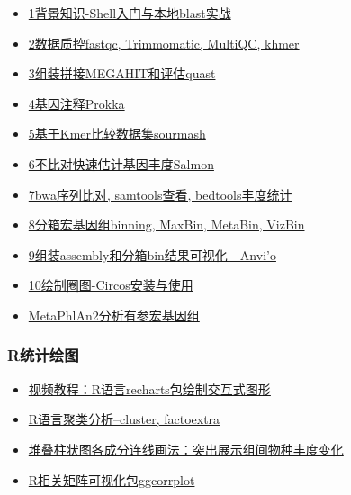 \documentclass[]{article}
\providecommand{\tightlist}{%
  \setlength{\itemsep}{0pt}\setlength{\parskip}{0pt}}
\numberwithin{figure}{section}
\numberwithin{table}{section}
\begin{document}
\begin{itemize}
\tightlist
\item
  \href{http://mp.weixin.qq.com/s/jASOBPzpwYCL-fWNUJJp8g}{1背景知识-Shell入门与本地blast实战}
\item
  \href{http://mp.weixin.qq.com/s/3O01eNMe79J_kUTaJjP6ag}{2数据质控fastqc, Trimmomatic, MultiQC, khmer}
\item
  \href{http://mp.weixin.qq.com/s/NMKX0iDuR_qOzmLXxC8MEQ}{3组装拼接MEGAHIT和评估quast}
\item
  \href{http://mp.weixin.qq.com/s/1TM61IrzrpVb5KhZ5A0kZQ}{4基因注释Prokka}
\item
  \href{https://mp.weixin.qq.com/s/Rmx-z1zxj7GF9ivJGWVvLg}{5基于Kmer比较数据集sourmash}
\item
  \href{http://mp.weixin.qq.com/s/2fwEtnEsBi5cJ65xyeoXxw}{6不比对快速估计基因丰度Salmon}
\item
  \href{http://mp.weixin.qq.com/s/rdTFTFg0rZOIa2_tuFEOUA}{7bwa序列比对, samtools查看, bedtools丰度统计}
\item
  \href{http://mp.weixin.qq.com/s/rZitcvykAlxnsNEzsW5JRg}{8分箱宏基因组binning, MaxBin, MetaBin, VizBin}
\item
  \href{http://mp.weixin.qq.com/s/FesH_mCunpZLpKC2pIg1UQ}{9组装assembly和分箱bin结果可视化---Anvi'o}
\item
  \href{http://mp.weixin.qq.com/s/FJlKY3kU5Fm6bYkjtwRkEw}{10绘制圈图-Circos安装与使用}
\item
  \href{http://mp.weixin.qq.com/s/xSjFGwcr1XIAZKdByJAWmQ}{MetaPhlAn2分析有参宏基因组}
\end{itemize}

\hypertarget{rux7edfux8ba1ux7ed8ux56fe}{%
\subsubsection{R统计绘图}\label{rux7edfux8ba1ux7ed8ux56fe}}

\begin{itemize}
\tightlist
\item
  \href{http://mp.weixin.qq.com/s/XOZD4ftYLPZjM2IVLYgUpA}{视频教程：R语言recharts包绘制交互式图形}
\item
  \href{https://mp.weixin.qq.com/s/9EChqbVmFrNWi_Siu4hdqQ}{R语言聚类分析--cluster, factoextra}
\item
  \href{https://mp.weixin.qq.com/s/FZWinr14RTs6YSUE_juaug}{堆叠柱状图各成分连线画法：突出展示组间物种丰度变化}
\item
  \href{http://mp.weixin.qq.com/s/AEfPqWO3S0mRnDZ_Ws9fnw}{R相关矩阵可视化包ggcorrplot}
\end{itemize}
\end{document}
